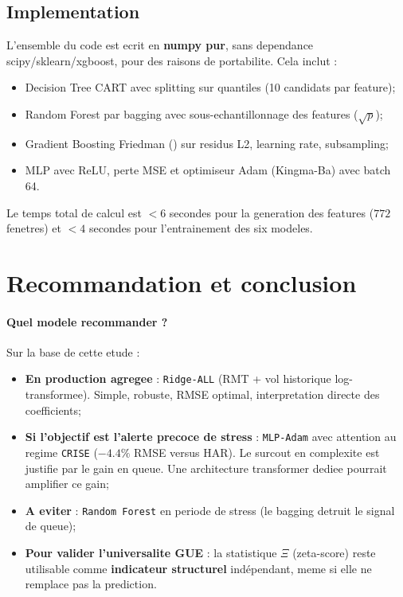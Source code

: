 \documentclass[11pt,a4paper]{article}
\begin{document}
\subsection{Implementation}
\label{sec:implem}

L'ensemble du code est ecrit en \textbf{numpy pur}, sans dependance scipy/sklearn/xgboost, pour des raisons de portabilite. Cela inclut :
\begin{itemize}[leftmargin=*]
\item Decision Tree CART avec splitting sur quantiles (10 candidats par feature);
\item Random Forest par bagging avec sous-echantillonnage des features ($\sqrt{p}$);
\item Gradient Boosting Friedman (\citealp{Friedman2001}) sur residus L2, learning rate, subsampling;
\item MLP avec ReLU, perte MSE et optimiseur Adam (Kingma-Ba) avec batch 64.
\end{itemize}
Le temps total de calcul est $< 6$ secondes pour la generation des features ($772$ fenetres) et $< 4$ secondes pour l'entrainement des six modeles.

\section{Recommandation et conclusion}
\label{sec:conclusion}

\paragraph{Quel modele recommander ?}
Sur la base de cette etude :
\begin{itemize}[leftmargin=*]
\item \textbf{En production agregee} : \texttt{Ridge-ALL} (RMT + vol historique log-transformee). Simple, robuste, RMSE optimal, interpretation directe des coefficients;
\item \textbf{Si l'objectif est l'alerte precoce de stress} : \texttt{MLP-Adam} avec attention au regime \texttt{CRISE} ($-4.4\%$ RMSE versus HAR). Le surcout en complexite est justifie par le gain en queue. Une architecture transformer dediee pourrait amplifier ce gain;
\item \textbf{A eviter} : \texttt{Random Forest} en periode de stress (le bagging detruit le signal de queue);
\item \textbf{Pour valider l'universalite GUE} : la statistique $\Xi$ (zeta-score) reste utilisable comme \textbf{indicateur structurel} ind\'ependant, meme si elle ne remplace pas la prediction.
\end{itemize}
\end{document}
